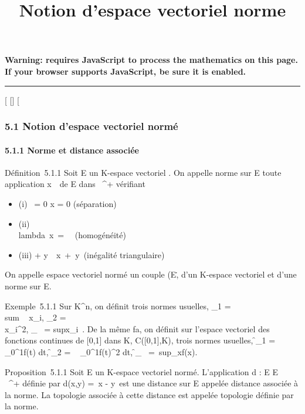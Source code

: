\documentclass[]{article}
\title{Notion d'espace vectoriel norme}
\author{}
\date{}
\begin{document}
\maketitle

\textbf{Warning: 
requires JavaScript to process the mathematics on this page.\\ If your
browser supports JavaScript, be sure it is enabled.}

\begin{center}\rule{3in}{0.4pt}\end{center}

[
[]
[

\subsubsection{5.1 Notion d'espace vectoriel normé}

\paragraph{5.1.1 Norme et distance associée}

Définition~5.1.1 Soit E un K-espace vectoriel . On appelle norme sur E
toute application
x\mapsto~\x\
de E dans ~^+ vérifiant

\begin{itemize}
\itemsep1pt\parskip0pt
\item
  (i) \x\ = 0
  \Leftrightarrow x = 0 (séparation)
\item
  (ii) \\lambda~x\ =
  \lambda~\x\
  (homogénéité)
\item
  (iii) \x + y\
  \leq\ x\
  +\ y\ (inégalité
  triangulaire)
\end{itemize}

On appelle espace vectoriel normé un couple
(E,\.\) d'un K-espace
vectoriel et d'une norme sur E.

Exemple~5.1.1 Sur K^n, on définit trois normes usuelles,
\x_1
= \\sum ~
x_i,
\x_2 =
\sqrt\\\sum
 x_i^2,
\x_\infty~
= supx_i~. De la
même fa\ccon, on définit sur l'espace vectoriel des
fonctions continues de [0,1] dans K, C([0,1],K), trois normes
usuelles,
\f_1
=\int ~
_0^1f(t) dt,
\f_2 =
\sqrt\int ~
_0^1f(t)^2 dt,
\f_\infty~
=\
sup_x\in[0,1]f(x).

Proposition~5.1.1 Soit E un K-espace vectoriel normé. L'application d :
E \times E \rightarrow~ ~^+ définie par d(x,y) =\ x
- y\ est une distance sur E appelée distance
associée à la norme. La topologie associée à cette distance est appelée
topologie définie par la norme.
\end{document}
